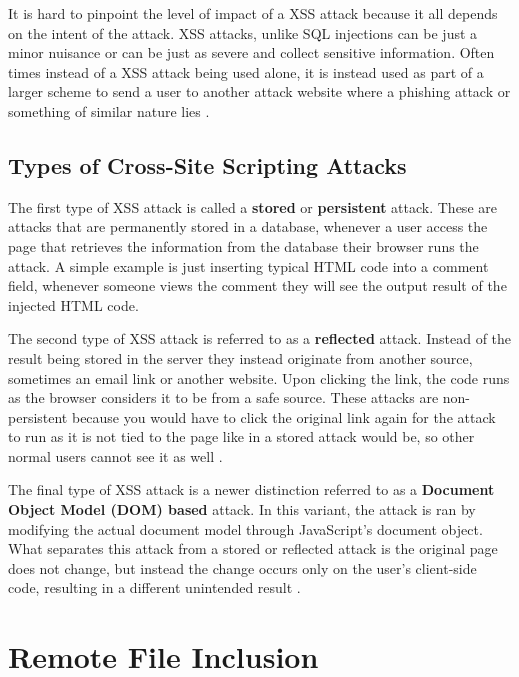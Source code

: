 It is hard to pinpoint the level of impact of a XSS attack because it all depends on the intent of the attack.  XSS attacks, unlike SQL injections can be just a minor nuisance or can be just as severe and collect sensitive information.  Often times instead of a XSS attack being used alone, it is instead used as part of a larger scheme to send a user to another attack website where a phishing attack or something of similar nature lies  \cite{aSurveyOnWeb, xssdm}.

\subsection{Types of Cross-Site Scripting Attacks}\label{sec:xssTypes}

The first type of XSS attack is called a \textbf{stored} or \textbf{persistent} attack.  These are attacks that are permanently stored in a database, whenever a user access the page that retrieves the information from the database their browser runs the attack. A simple example is just inserting typical HTML code into a comment field, whenever someone views the comment they will see the output result of the injected HTML code.

The second type of XSS attack is referred to as a \textbf{reflected} attack.  Instead of the result being stored in the server they instead originate from another source, sometimes an email link or another website.  Upon clicking the link, the code runs as the browser considers it to be from a safe source.  These attacks are non-persistent because you would have to click the original link again for the attack to run as it is not tied to the page like in a stored attack would be, so other normal users cannot see it as well \cite{owaspXSS}.

The final type of XSS attack is a newer distinction referred to as a \textbf{Document Object Model (DOM) based} attack.  In this variant, the attack is ran by modifying the actual document model through JavaScript's document object.  What separates this attack from a stored or reflected attack is the original page does not change, but instead the change occurs only on the user's client-side code, resulting in a different unintended result \cite{owaspXSSDOM}.

\section{Remote File Inclusion}\label{sec:rfiExplanation}

